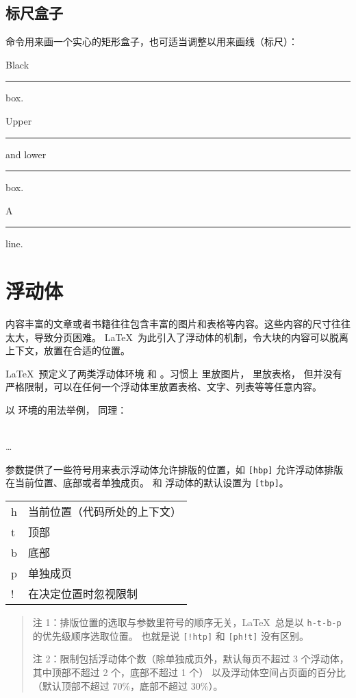 \subsection{标尺盒子}\label{subsec:rules}

 命令用来画一个实心的矩形盒子，也可适当调整以用来画线（标尺）：
\begin{command}
\end{command}
\begin{example}
Black \rule{12pt}{4pt} box. 

Upper \rule[4pt]{6pt}{8pt} and
lower \rule[-4pt]{6pt}{8pt} box.

A \rule[-.4pt]{3em}{.4pt} line.
\end{example}

\section{浮动体}\label{sec:float}

内容丰富的文章或者书籍往往包含丰富的图片和表格等内容。这些内容的尺寸往往太大，导致分页困难。
\LaTeX\ 为此引入了浮动体的机制，令大块的内容可以脱离上下文，放置在合适的位置。

\LaTeX\ 预定义了两类浮动体环境  和 。习惯上  里放图片， 里放表格，
但并没有严格限制，可以在任何一个浮动体里放置表格、文字、列表等等任意内容。

以  环境的用法举例， 同理：
\begin{command}
 \\
\ldots \\
\end{command}

 参数提供了一些符号用来表示浮动体允许排版的位置，如 \texttt{[hbp]} 允许浮动体排版在当前位置、底部或者单独成页。
 和  浮动体的默认设置为 \texttt{[tbp]}。
\begin{center}
\begin{tabular}{>{\ttfamily}lp{14em}}
 \hline
 h & 当前位置（代码所处的上下文） \\
 t & 顶部 \\
 b & 底部 \\
 p & 单独成页 \\[0.5ex]
 ! & 在决定位置时忽视限制 \\
 \hline
\end{tabular}
\end{center}
\begin{quote}\footnotesize
注 1：排版位置的选取与参数里符号的顺序无关，\LaTeX\ 总是以 \texttt{h-t-b-p} 的优先级顺序选取位置。
也就是说 \texttt{[!htp]} 和 \texttt{[ph!t]} 没有区别。\par
注 2：限制包括浮动体个数（除单独成页外，默认每页不超过 3 个浮动体，其中顶部不超过 2 个，底部不超过 1 个）
以及浮动体空间占页面的百分比（默认顶部不超过 70\%，底部不超过 30\%）。
\end{quote}

